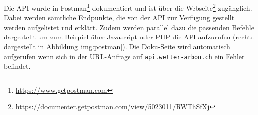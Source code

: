 Die API wurde in Postman\footnote{\url{https://www.getpostman.com}} dokumentiert und ist über die Webseite\footnote{\url{https://documenter.getpostman.com/view/5023011/RWThSfXj}} zugänglich. Dabei werden sämtliche Endpunkte, die von der API zur Verfügung gestellt werden aufgelistet und erklärt. Zudem werden parallel dazu die passenden Befehle dargestellt um zum Beispiel über Javascript oder PHP die API aufzurufen (rechts dargestellt in Abbildung\,\ref{img:postman}). Die Doku-Seite wird automatisch aufgerufen wenn sich in der URL-Anfrage auf \texttt{api.wetter-arbon.ch} ein Fehler befindet.
